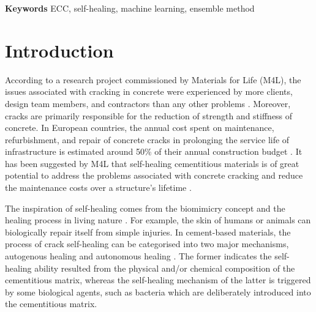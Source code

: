 \documentclass[11pt]{article}
\begin{document}
\smallskip
\noindent \textbf{Keywords } ECC, self-healing, machine learning, ensemble method

	\section{Introduction}
	
	According to a research project commissioned by Materials for Life (M4L), the issues associated with cracking in concrete were experienced by more clients, design team members, and contractors than any other problems \cite{gardner2018survey}. Moreover, cracks are primarily responsible for the reduction of strength and stiffness of concrete. In European countries, the annual cost spent on maintenance, refurbishment, and repair of concrete cracks in prolonging the service life of infrastructure is estimated around 50\% of their annual construction budget \cite{cailleux2009investigations}. It has been suggested by M4L that self-healing cementitious materials is of great potential to address the problems associated with concrete cracking and reduce the maintenance costs over a structure’s lifetime \cite{gardner2018survey}.
	

    The inspiration of self-healing comes from the biomimicry concept and the healing process in living nature \cite{ramadan2017modeling}. For example, the skin of humans or animals can biologically repair itself from simple injuries. In cement-based materials, the process of crack self-healing can be categorised into two major mechanisms, autogenous healing and autonomous healing \cite{tang2015robust}. The former indicates the self-healing ability resulted from the physical and/or chemical composition of the cementitious matrix, whereas the self-healing mechanism of the latter is triggered by some biological agents, such as bacteria which are deliberately introduced into the cementitious matrix.
	
\end{document}
